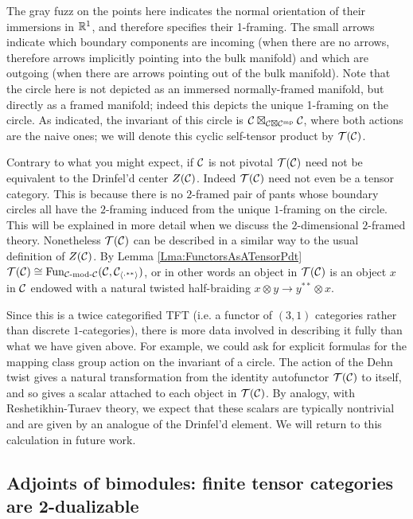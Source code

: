 \documentclass{amsart}
\begin{document}
\nid The gray fuzz on the points here indicates the normal orientation of their immersions in $\mathbb R^1$, and therefore specifies their 1-framing.  The small arrows indicate which boundary components are incoming (when there are no arrows, therefore arrows implicitly pointing into the bulk manifold) and which are outgoing (when there are arrows pointing out of the bulk manifold).  Note that the circle here is not depicted as an immersed normally-framed manifold, but directly as a framed manifold; indeed this depicts the unique 1-framing on the circle.  As indicated, the invariant of this circle is $\mathcal C \boxtimes_{\mathcal C \boxtimes \mathcal C^{\mathrm{mp}}} \mathcal C$, where both actions are the naive ones; we will denote this cyclic self-tensor product by $\mathcal T(\mathcal C)$.

\begin{warning}
Contrary to what you might expect,  if $\mathcal C$ is not pivotal $\mathcal T(\mathcal C)$ need not be equivalent to the Drinfel'd center $Z(\mathcal C)$.  Indeed $\mathcal T(\mathcal C)$ need not even be a tensor category.  This is because there is no $2$-framed pair of pants whose boundary circles all have the $2$-framing induced from the unique $1$-framing on the circle.  This will be explained in more detail when we discuss the $2$-dimensional $2$-framed theory.  Nonetheless $\mathcal T(\mathcal C)$ can be described in a similar way to the usual definition of $Z(\mathcal C)$.  By Lemma \ref{Lma:FunctorsAsATensorPdt} $\mathcal T(\mathcal C) \cong \operatorname{Fun}_{\mathcal C\text{-mod-}\mathcal C}(\mathcal C, \mathcal C_{\langle \cdot^{**} \rangle})$, or in other words an object in $\mathcal T(\mathcal C)$ is an object $x$ in $\mathcal C$ endowed with a natural twisted half-braiding $x \otimes y \rightarrow y^{**} \otimes x$.
\end{warning}
\begin{remark}
Since this is a twice categorified TFT (i.e. a functor of $(3,1)$ categories rather than discrete $1$-categories), there is more data involved in describing it fully than what we have given above.  For example, we could ask for explicit formulas for the mapping class group action on the invariant of a circle.  The action of the Dehn twist gives a natural transformation from the identity autofunctor $\mathcal T(\mathcal C)$ to itself, and so gives a scalar attached to each object in $\mathcal T(\mathcal C)$.  By analogy, with Reshetikhin-Turaev theory, we expect that these scalars are typically nontrivial and are given by an analogue of the Drinfel'd element.   We will return to this calculation in future work.
\end{remark} 

\subsection{Adjoints of bimodules: finite tensor categories are 2-dualizable}  \label{sec:df-modules}
\end{document}
